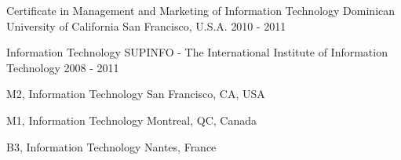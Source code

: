 \begin{cventries}
  \cventry
    {Certificate in Management and Marketing of Information Technology}
    {Dominican University of California}
    {San Francisco, U.S.A.}
    {2010 - 2011}
    {
      \begin{cvitems}
      \end{cvitems}
    }
    
  \cventry
    {Information Technology}
    {SUPINFO - The International Institute of Information Technology}
    {}
    {2008 - 2011}
    {
      \begin{cvitems}
        \item {M2, Information Technology \hfill {\textcolor{awesome-red}{San Francisco, CA, USA}}}
        \item {M1, Information Technology \hfill {\textcolor{awesome-red}{Montreal, QC, Canada}}}
        \item {B3, Information Technology \hfill {\textcolor{awesome-red}{Nantes, France}}}
      \end{cvitems}
    }
\end{cventries}

